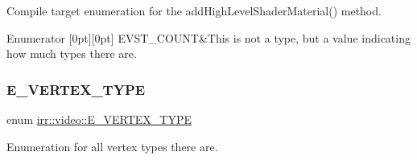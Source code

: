 Compile target enumeration for the add\+High\+Level\+Shader\+Material() method. 

\begin{DoxyEnumFields}{Enumerator}
[0pt][0pt]{}\mbox{\label{namespaceirr_1_1video_a9decae50d4dc2455e7b009f5c71b24f9a7bcfbb56a27827b74d7490ac9b4c5805}} 
E\+V\+S\+T\+\_\+\+C\+O\+U\+NT&This is not a type, but a value indicating how much types there are. \\
\hline

\end{DoxyEnumFields}
\mbox{\label{namespaceirr_1_1video_a0e3b59e025e0d0db0ed2ee0ce904deac}} 
\subsubsection{\texorpdfstring{E\+\_\+\+V\+E\+R\+T\+E\+X\+\_\+\+T\+Y\+PE}{E\_VERTEX\_TYPE}}
{\footnotesize\ttfamily enum \hyperlink{namespaceirr_1_1video_a0e3b59e025e0d0db0ed2ee0ce904deac}{irr\+::video\+::\+E\+\_\+\+V\+E\+R\+T\+E\+X\+\_\+\+T\+Y\+PE}}



Enumeration for all vertex types there are. 

